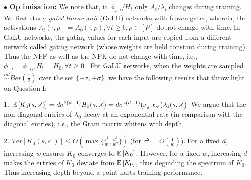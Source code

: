 \documentclass{article}
\begin{document}
$\bullet$ \textbf{Optimisation:} We note that, in $\phi_{x,t}/H_t$ only $A_t/\lambda_t$ changes during training. %
We first study \emph{gated linear unit} (GaLU) networks with frozen gates, wherein, the activations $A_t(\cdot,p)=A_0(\cdot,p),\forall t\geq 0,p\in[P]$ do not change with time. In GaLU networks, the gating values for each input are copied from a different network called gating network (whose weights are held constant during training). Thus the NPF as well as the NPK do not change with time, i.e., $\phi_{\cdot,t}=\phi_{\cdot,0}, H_t=H_0,\forall t\geq 0$ . 
For GaLU networks, when the weights are sampled $\stackrel{iid}\sim Ber(\frac{1}{2})$ over the set $\{-\sigma,+\sigma\}$, we have the following results that throw light on Question I: 

$1.$ $\mathbb{E}\left[K_0(s,s')\right]=d\sigma^{2(d-1)}H_0(s,s')=d\sigma^{2(d-1)}(x_s^\top x_{s'})\lambda_0(s,s')$. We argue that the non-diagonal entries of $\lambda_0$ decay at an exponential rate (in comparison with the diagonal entries), i.e., the Gram matrix whitens with depth.

$2.$ $Var\left[K_0(s,s')\right]\leq O(\max\{\frac{d^2}{w}, \frac{d^3}{w^2}\})$ (for $\sigma^2=O(\frac{1}w)$). For a fixed $d$, increasing $w$ ensures $K_0$ converges to $\mathbb{E}\left[K_0\right]$. However, for a fixed $w$, increasing $d$ makes the entries of $K_0$ deviate from $\mathbb{E}\left[K_0\right]$, thus degrading the spectrum of $K_0$. Thus increasing depth beyond a point hurts training performance.
\end{document}
